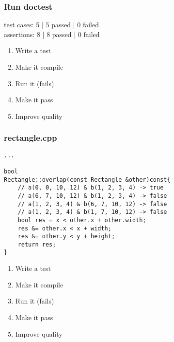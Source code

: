 \begin{frame}[fragile]
\frametitle{Run doctest}
\begin{minipage}[t]{0.48\linewidth}
test cases: 5 | 5 passed | 0 failed\\
assertions: 8 | 8 passed | 0 failed\\
\end{minipage}\hfill
\begin{minipage}[t]{0.28\linewidth}
  \small
  \begin{enumerate} 
    \item \textcolor{deadcolor}{Write a test}
    \item \textcolor{deadcolor}{Make it compile}
    \item \textcolor{deadcolor}{Run it (fails)}
    \item \textcolor{activecolor}{Make it pass}
    \item \textcolor{deadcolor}{Improve quality}
  \end{enumerate} 
\end{minipage}
\end{frame}


\begin{frame}[fragile]
\frametitle{rectangle.cpp}
\begin{minipage}[t]{0.48\linewidth}
\begin{lstlisting}
...

bool 
Rectangle::overlap(const Rectangle &other)const{
    // a(0, 0, 10, 12) & b(1, 2, 3, 4) -> true
    // a(6, 7, 10, 12) & b(1, 2, 3, 4) -> false
    // a(1, 2, 3, 4) & b(6, 7, 10, 12) -> false
    // a(1, 2, 3, 4) & b(1, 7, 10, 12) -> false
    bool res = x < other.x + other.width;
    res &= other.x < x + width;
    res &= other.y < y + height;
    return res;
}
\end{lstlisting}
\end{minipage}\hfill
\begin{minipage}[t]{0.28\linewidth}
  \small
  \begin{enumerate} 
    \item \textcolor{deadcolor}{Write a test}
    \item \textcolor{deadcolor}{Make it compile}
    \item \textcolor{deadcolor}{Run it (fails)}
    \item \textcolor{deadcolor}{Make it pass}
    \item \textcolor{activecolor}{Improve quality}
  \end{enumerate} 
\end{minipage}
\end{frame}


